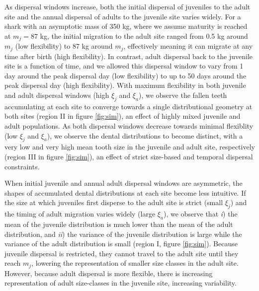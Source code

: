 \documentclass[]{rsos}%
\begin{document}
As dispersal windows increase, both the initial dispersal of juveniles to the adult site and the annual dispersal of adults to the juvenile site varies widely.
For a shark with an asymptotic mass of 350 kg, where we assume maturity is reached at $m_j = 87$ kg, the initial migration to the adult site ranged from 0.5 kg around $m_j$ (low flexibility) to 87 kg around $m_j$, effectively meaning it can migrate at any time after birth (high flexibility).
In contrast, adult dispersal back to the juvenile site is a function of time, and we allowed this dispersal window to vary from 1 day around the peak dispersal day (low flexibility) to up to 50 days around the peak dispersal day (high flexibility).
With maximum flexibility in both juvenile and adult dispersal windows (high $\xi_j$ and $\xi_a$), we observe the fallen teeth accumulating at each site to converge towards a single distributional geometry at both sites (region II in figure \ref{fig:sim}), an effect of highly mixed juvenile and adult populations.
As both dispersal windows decrease towards minimal flexiblity (low $\xi_j$ and $\xi_a$), we observe the dental distributions to become distinct, with a very low and very high mean tooth size in the juvenile and adult site, respectively (region III in figure \ref{fig:sim}), an effect of strict size-based and temporal dispersal constraints.

When initial juvenile and annual adult dispersal windows are asymmetric, the shapes of accumulated dental distributions at each site become less intuitive.
If the size at which juveniles first disperse to the adult site is strict (small $\xi_j$) and the timing of adult migration varies widely (large $\xi_a$), we observe that \emph{i}) the mean of the juvenile distribution is much lower than the mean of the adult distribution, and \emph{ii}) the variance of the juvenile distribution is large while the variance of the adult distribution is small (region I, figure \ref{fig:sim}).
Because juvenile dispersal is restricted, they cannot travel to the adult site until they reach $m_j$, lowering the representation of smaller size classes in the adult site. 
However, because adult dispersal is more flexible, there is increasing representation of adult size-classes in the juvenile site, increasing variability.
\end{document}
